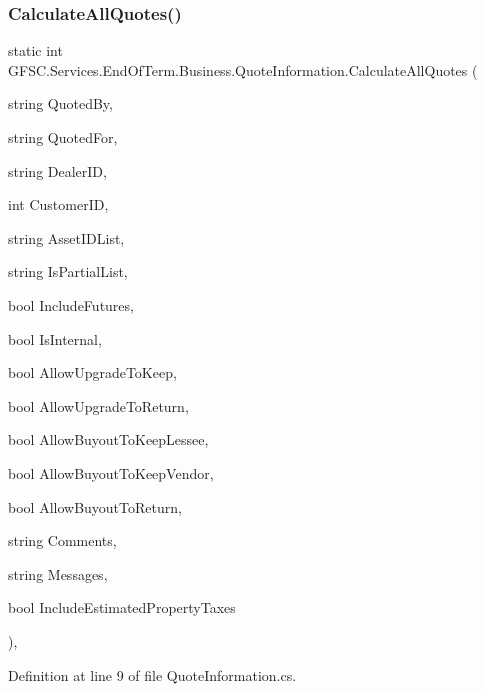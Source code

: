 \subsubsection{\texorpdfstring{Calculate\+All\+Quotes()}{CalculateAllQuotes()}}
{\footnotesize\ttfamily static int G\+F\+S\+C.\+Services.\+End\+Of\+Term.\+Business.\+Quote\+Information.\+Calculate\+All\+Quotes (\begin{DoxyParamCaption}\item[{string}]{Quoted\+By,  }\item[{string}]{Quoted\+For,  }\item[{string}]{Dealer\+ID,  }\item[{int}]{Customer\+ID,  }\item[{string}]{Asset\+I\+D\+List,  }\item[{string}]{Is\+Partial\+List,  }\item[{bool}]{Include\+Futures,  }\item[{bool}]{Is\+Internal,  }\item[{bool}]{Allow\+Upgrade\+To\+Keep,  }\item[{bool}]{Allow\+Upgrade\+To\+Return,  }\item[{bool}]{Allow\+Buyout\+To\+Keep\+Lessee,  }\item[{bool}]{Allow\+Buyout\+To\+Keep\+Vendor,  }\item[{bool}]{Allow\+Buyout\+To\+Return,  }\item[{string}]{Comments,  }\item[{string}]{Messages,  }\item[{bool}]{Include\+Estimated\+Property\+Taxes }\end{DoxyParamCaption})\hspace{0.3cm}{\ttfamily [static]}, {\ttfamily [package]}}



Definition at line 9 of file Quote\+Information.\+cs.

\mbox{\label{class_g_f_s_c_1_1_services_1_1_end_of_term_1_1_business_1_1_quote_information_a7dd78540ce884730d4d6f8e9d3b3e6a1}} 
